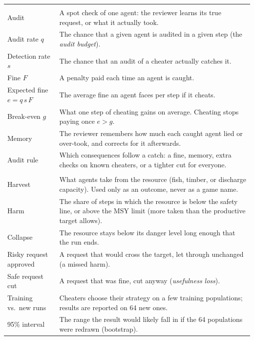 \begin{tabular}{@{}p{}p{}@{}}
\addlinespace
\multicolumn{2}{@{}l}{\emph{Checking and consequences}} \\
Audit & A spot check of one agent: the reviewer learns its true request, or what it actually took. \\
Audit rate $q$ & The chance that a given agent is audited in a given step (the \emph{audit budget}). \\
Detection rate $s$ & The chance that an audit of a cheater actually catches it. \\
Fine $F$ & A penalty paid each time an agent is caught. \\
Expected fine $e=q\,s\,F$ & The average fine an agent faces per step if it cheats. \\
Break-even $g$ & What one step of cheating gains on average. Cheating stops paying once $e>g$. \\
Memory & The reviewer remembers how much each caught agent lied or over-took, and corrects for it afterwards. \\
Audit rule & Which consequences follow a catch: a fine, memory, extra checks on known cheaters, or a tighter cut for everyone. \\
\addlinespace
\multicolumn{2}{@{}l}{\emph{Measures}} \\
Harvest & What agents take from the resource (fish, timber, or discharge capacity). Used only as an outcome, never as a game name. \\
Harm & The share of steps in which the resource is below the safety line, or above the MSY limit (more taken than the productive target allows). \\
Collapse & The resource stays below its danger level long enough that the run ends. \\
Risky request approved & A request that would cross the target, let through unchanged (a missed harm). \\
Safe request cut & A request that was fine, cut anyway (\emph{usefulness loss}). \\
Training vs.\ new runs & Cheaters choose their strategy on a few training populations; results are reported on 64 new ones. \\
95\% interval & The range the result would likely fall in if the 64 populations were redrawn (bootstrap). \\
\bottomrule
\end{tabular}
